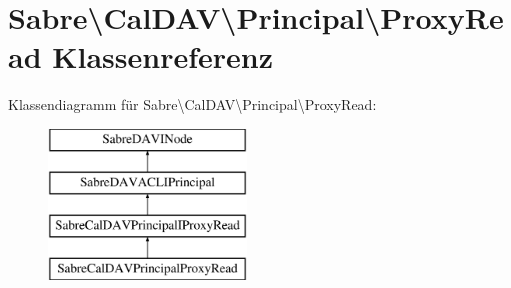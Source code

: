 \hypertarget{class_sabre_1_1_cal_d_a_v_1_1_principal_1_1_proxy_read}{}\section{Sabre\textbackslash{}Cal\+D\+AV\textbackslash{}Principal\textbackslash{}Proxy\+Read Klassenreferenz}
\label{class_sabre_1_1_cal_d_a_v_1_1_principal_1_1_proxy_read}
Klassendiagramm für Sabre\textbackslash{}Cal\+D\+AV\textbackslash{}Principal\textbackslash{}Proxy\+Read\+:\begin{figure}[H]
\begin{center}
\leavevmode
\includegraphics[height=4.000000cm]{class_sabre_1_1_cal_d_a_v_1_1_principal_1_1_proxy_read}
\end{center}
\end{figure}
